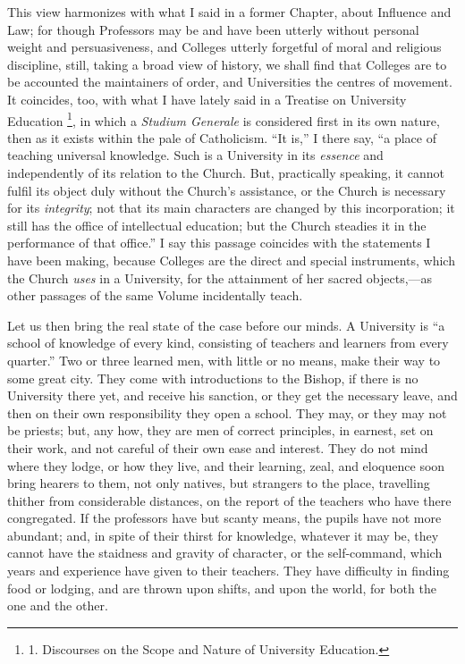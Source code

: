 This view harmonizes with what
I said in a former Chapter, about Influence and Law; for though
Professors may be and have been utterly without personal weight and
persuasiveness, and Colleges utterly forgetful of moral and religious
discipline, still, taking a broad view of history, we shall find that
Colleges are to be accounted the maintainers of order, and
Universities the centres of movement. It coincides, too, with what I
have lately said in a Treatise on University Education \footnote{1. Discourses on the Scope and
Nature of University Education.}, in which a \emph{Studium Generale} is considered first in its
own nature, then as it exists within the pale of Catholicism. ``It is,'' I there say,
``a place of teaching universal knowledge.
Such is a University in its \emph{essence} and independently of its
relation to the Church. But, practically speaking, it cannot fulfil
its object duly without the Church's assistance, or the Church is
necessary for its \emph{integrity}; not that its main characters are
changed by this incorporation; it still has the office of intellectual
education; but the Church steadies it in the performance of that
office.'' I say this passage coincides with the statements I have
been making, because Colleges are the direct and special instruments,
which the Church \emph{uses} in a University, for the attainment of
her sacred objects,—as other passages of the same Volume
incidentally teach.

Let us then bring the real
state of the case before our minds. A University is ``a school of
knowledge of every kind, consisting of teachers and learners from
every quarter.'' Two or three learned men, with little or no means,
make their way to some great city. They come with introductions to the
Bishop, if there is no University there yet, and receive his sanction,
or they get the necessary leave, and then on their own responsibility
they open a school. They may, or they may not be priests; but, any
how, they are men of correct principles, in earnest, set on their
work, and not careful of their own ease and interest. They do not mind
where they lodge, or how they live, and their learning, zeal, and
eloquence soon bring hearers to them, not only natives, but strangers
to the place, travelling thither from considerable distances, on the
report of the teachers who have there congregated. If the professors
have but scanty means, the pupils have not more abundant; and, in
spite of their thirst for knowledge, whatever it may be, they cannot
have the staidness and gravity of character, or the
self-command, which years and experience have given to their teachers.
They have difficulty in finding food or lodging, and are thrown upon
shifts, and upon the world, for both the one and the other.

